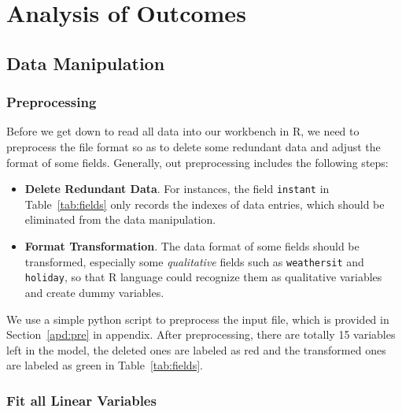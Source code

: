 \section{Analysis of Outcomes}
\label{sec:outcome}
\subsection{Data Manipulation}
\subsubsection{Preprocessing}
Before we get down to read all data into our workbench in R, we need to preprocess the file format so as to delete some redundant data and adjust the format of some fields. Generally, out preprocessing includes the following steps:
\begin{itemize}
  \item \textbf{Delete Redundant Data}. For instances, the field \texttt{instant} in  Table~\ref{tab:fields} only records the indexes of data entries, which should be eliminated from the data manipulation.
  \item \textbf{Format Transformation}. The data format of some fields should be transformed, especially some \emph{qualitative} fields such as \texttt{weathersit} and \texttt{holiday}, so that R language could recognize them as qualitative variables and create dummy variables. 
\end{itemize}

We use a simple python script to preprocess the input file, which is provided in Section~\ref{apd:pre} in appendix. After preprocessing, there are totally 15 variables left in the model, the deleted ones are labeled as {\color{red}red} and the transformed ones are labeled as {\color{green}green} in Table~\ref{tab:fields}.

\subsubsection{Fit all Linear Variables}

